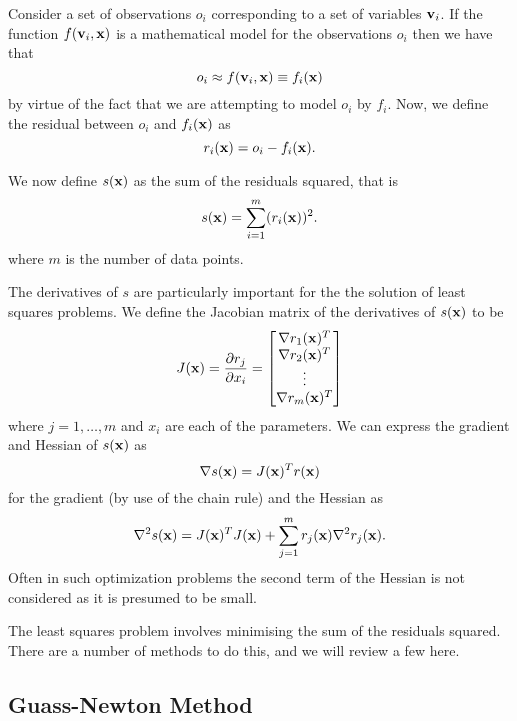Consider a set of observations $o_i$ corresponding to a set of variables $\mathbf{v}_i$. If the function $f(\mathbf{v}_i, \mathbf{x})$
is a mathematical model for the observations $o_i$ then we have that
\begin{equation}
o_i \approx f(\mathbf{v}_i, \mathbf{x}) \equiv f_i(\mathbf{x})
\end{equation}
by virtue of the fact that we are attempting to model $o_i$ by $f_i$. Now, we define the residual
between $o_i$ and $f_i(\mathbf{x})$ as
\begin{equation}
r_i(\mathbf{x}) = o_i - f_i(\mathbf{x}) .
\end{equation}

We now define $s(\mathbf{x})$ as the sum of the residuals squared, that is
\begin{equation}
s(\mathbf{x}) = \sum_{i=1}^{m} (r_{i}(\mathbf{x}))^2 .
\end{equation}
where $m$ is the number of data points.

The derivatives of $s$ are particularly important for the the solution of least squares problems.
We define the Jacobian matrix of the derivatives of $s(\mathbf{x})$ to be 
\begin{equation}
J(\mathbf{x}) = \frac{\partial r_j}{\partial x_i} = \begin{bmatrix} \nabla r_1(\mathbf{x})^{T} \\ \nabla r_2(\mathbf{x})^{T} \\ \vdots \\ \nabla r_m(\mathbf{x})^{T} \end{bmatrix}
\end{equation}
where $j=1,\ldots,m$ and $x_i$ are each of the parameters. We can express the gradient and Hessian of
$s(\mathbf{x})$ as
\begin{equation}
\nabla s(\mathbf{x}) = J(\mathbf{x})^T r(\mathbf{x})
\end{equation}
for the gradient (by use of the chain rule) and the Hessian as
\begin{equation}
\nabla^2 s(\mathbf{x}) = J(\mathbf{x})^T J(\mathbf{x}) + \sum_{j=1}^{m} r_j(\mathbf{x}) \nabla^2 r_j(\mathbf{x}) .
\end{equation}
Often in such optimization problems the second term of the Hessian is not considered as it is presumed
to be small.

The least squares problem involves minimising the sum of the residuals squared. 
There are a number of methods to do this, and we will review a few here.

\subsection{Guass-Newton Method}

